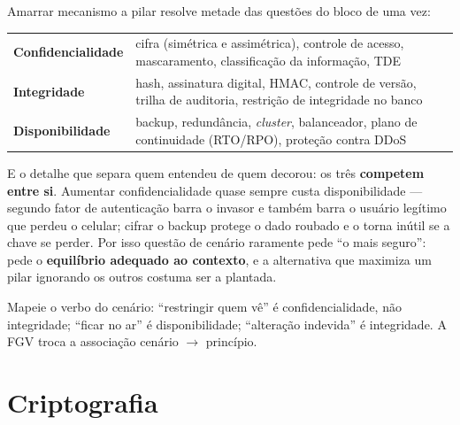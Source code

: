 \begin{conceito}
Amarrar mecanismo a pilar resolve metade das questões do bloco de uma vez:

\begin{center}
\begin{tabular}{@{}p{3.4cm}p{8.6cm}@{}}
\toprule
\textbf{Confidencialidade} & cifra (simétrica e assimétrica), controle de acesso, mascaramento, classificação da informação, TDE \\
\textbf{Integridade} & hash, assinatura digital, HMAC, controle de versão, trilha de auditoria, restrição de integridade no banco \\
\textbf{Disponibilidade} & backup, redundância, \emph{cluster}, balanceador, plano de continuidade (RTO/RPO), proteção contra DDoS \\
\bottomrule
\end{tabular}
\end{center}

E o detalhe que separa quem entendeu de quem decorou: os três \textbf{competem
entre si}. Aumentar confidencialidade quase sempre custa disponibilidade ---
segundo fator de autenticação barra o invasor e também barra o usuário
legítimo que perdeu o celular; cifrar o backup protege o dado roubado e o
torna inútil se a chave se perder. Por isso questão de cenário raramente pede
``o mais seguro'': pede o \textbf{equilíbrio adequado ao contexto}, e a
alternativa que maximiza um pilar ignorando os outros costuma ser a plantada.
\end{conceito}

\begin{pegadinha}
Mapeie o verbo do cenário: ``restringir quem vê'' é confidencialidade, não
integridade; ``ficar no ar'' é disponibilidade; ``alteração indevida'' é
integridade. A FGV troca a associação cenário $\to$ princípio.
\end{pegadinha}

\section{Criptografia}

